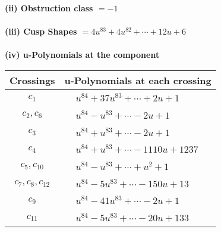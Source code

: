 \documentclass[1p]{elsarticle_modified}
\theoremstyle{definition}
\begin{document}
\flushleft \textbf{(ii) Obstruction class $= -1$}\\~\\
\flushleft \textbf{(iii) Cusp Shapes $= 4 u^{83}+4 u^{82}+\cdots+12 u+6$}\\~\\
\newpage\renewcommand{\arraystretch}{1}
\flushleft \textbf{(iv) u-Polynomials at the component}\newline \\
\begin{tabular}{m{50pt}|m{274pt}}
Crossings & \hspace{64pt}u-Polynomials at each crossing \\
\hline $$\begin{aligned}c_{1}\end{aligned}$$&$\begin{aligned}
&u^{84}+37 u^{83}+\cdots+2 u+1
\end{aligned}$\\
\hline $$\begin{aligned}c_{2},c_{6}\end{aligned}$$&$\begin{aligned}
&u^{84}- u^{83}+\cdots-2 u+1
\end{aligned}$\\
\hline $$\begin{aligned}c_{3}\end{aligned}$$&$\begin{aligned}
&u^{84}+u^{83}+\cdots-2 u+1
\end{aligned}$\\
\hline $$\begin{aligned}c_{4}\end{aligned}$$&$\begin{aligned}
&u^{84}+u^{83}+\cdots-1110 u+1237
\end{aligned}$\\
\hline $$\begin{aligned}c_{5},c_{10}\end{aligned}$$&$\begin{aligned}
&u^{84}- u^{83}+\cdots+u^2+1
\end{aligned}$\\
\hline $$\begin{aligned}c_{7},c_{8},c_{12}\end{aligned}$$&$\begin{aligned}
&u^{84}-5 u^{83}+\cdots-150 u+13
\end{aligned}$\\
\hline $$\begin{aligned}c_{9}\end{aligned}$$&$\begin{aligned}
&u^{84}-41 u^{83}+\cdots-2 u+1
\end{aligned}$\\
\hline $$\begin{aligned}c_{11}\end{aligned}$$&$\begin{aligned}
&u^{84}-5 u^{83}+\cdots-20 u+133
\end{aligned}$\\
\hline
\end{tabular}\\~\\
\end{document}
